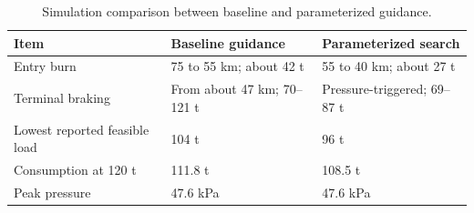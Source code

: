 \begin{table}[htbp]
\caption{Simulation comparison between baseline and parameterized guidance.}
\label{tab:src15}
\small
\setlength{\tabcolsep}{3.5pt}
\begin{tabularx}{\linewidth}{@{}p{.34\linewidth}XX@{}}
\toprule
Item & Baseline guidance & Parameterized search \\
\midrule
Entry burn & 75 to 55 km; about 42 t & 55 to 40 km; about 27 t \\
Terminal braking & From about 47 km; 70--121 t & Pressure-triggered; 69--87 t \\
Lowest reported feasible load & 104 t & 96 t \\
Consumption at 120 t & 111.8 t & 108.5 t \\
Peak pressure & 47.6 kPa & 47.6 kPa \\
\bottomrule
\end{tabularx}
\end{table}

